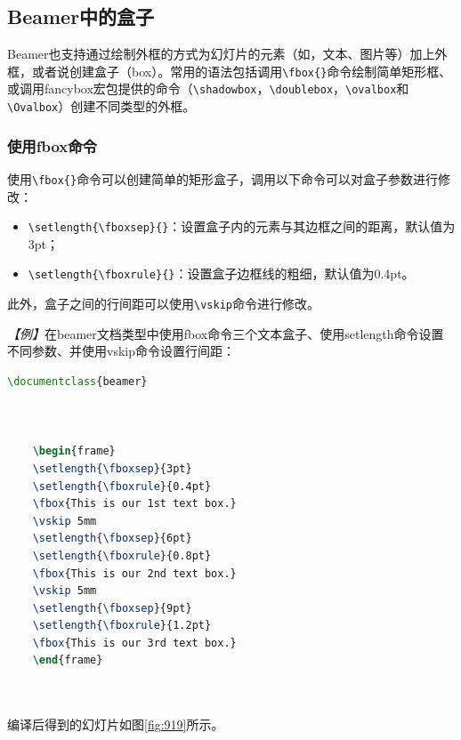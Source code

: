 \subsection{Beamer中的盒子}

Beamer也支持通过绘制外框的方式为幻灯片的元素（如，文本、图片等）加上外框，或者说创建盒子（box）。常用的语法包括调用\texttt{\textbackslash{}fbox\{\}}命令绘制简单矩形框、或调用fancybox宏包提供的命令（\texttt{\textbackslash{}shadowbox}，\texttt{\textbackslash{}doublebox}，\texttt{\textbackslash{}ovalbox}和\texttt{\textbackslash{}Ovalbox}）创建不同类型的外框。

\subsubsection{使用fbox命令}

使用\texttt{\textbackslash{}fbox\{\}}命令可以创建简单的矩形盒子，调用以下命令可以对盒子参数进行修改：
\begin{itemize}
    \item \texttt{\textbackslash{}setlength\{\textbackslash{}fboxsep\}\{\}}：设置盒子内的元素与其边框之间的距离，默认值为3pt；
    \item \texttt{\textbackslash{}setlength\{\textbackslash{}fboxrule\}\{\}}：设置盒子边框线的粗细，默认值为0.4pt。
\end{itemize}

此外，盒子之间的行间距可以使用\texttt{\textbackslash{}vskip}命令进行修改。

\emph{【例】}在beamer文档类型中使用fbox命令三个文本盒子、使用setlength命令设置不同参数、并使用vskip命令设置行间距：
\begin{lstlisting}[language=TeX]
    \documentclass{beamer}

    

    \begin{frame}
    \setlength{\fboxsep}{3pt}
    \setlength{\fboxrule}{0.4pt}
    \fbox{This is our 1st text box.}
    \vskip 5mm
    \setlength{\fboxsep}{6pt}
    \setlength{\fboxrule}{0.8pt}
    \fbox{This is our 2nd text box.}
    \vskip 5mm
    \setlength{\fboxsep}{9pt}
    \setlength{\fboxrule}{1.2pt}
    \fbox{This is our 3rd text box.}
    \end{frame}

    
\end{lstlisting}

编译后得到的幻灯片如图\ref{fig:919}所示。

